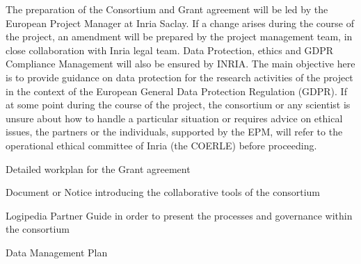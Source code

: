 \begin{workpackage}[id=management,type=MGT,wphases=1-48,
  short=Management,
  title=Management,
  lead=Inr,InrRM=34,InnRM=2,SacRM=2,TumRM=2,LieRM=2,BelRM=2,DelRM=2,FauRM=2]
\begin{tasklist}
  \begin{task}[id=legal,title={Legal Management (data, ethics, GDPR)},shorttitle={Legal},
      lead=Inr,InrRM=4,wphases=1-48]
    The preparation of the Consortium and Grant agreement will be led
    by the European Project Manager at Inria Saclay. If a change
    arises during the course of the project, an amendment will be
    prepared by the project management team, in close collaboration
    with Inria legal team.  Data Protection, ethics and GDPR
    Compliance Management will also be ensured by INRIA. The main
    objective here is to provide guidance on data protection for the
    research activities of the project in the context of the European
    General Data Protection Regulation (GDPR). If at some point during
    the course of the project, the consortium or any scientist is
    unsure about how to handle a particular situation or requires
    advice on ethical issues, the partners or the individuals,
    supported by the EPM, will refer to the operational ethical
    committee of Inria (the COERLE) before proceeding.
  \end{task}
\end{tasklist}




\begin{wpdelivs}
  \begin{wpdeliv}[due=2,id=workplan,dissem=PU,nature=R,lead=Inr,task=coordination]{Detailed workplan for the Grant agreement}\end{wpdeliv}

  \begin{wpdeliv}[due=2,id=collab-tools,dissem=PU,nature=R,lead=Inr,
task=coordination]{Document or Notice introducing the collaborative tools of the consortium}\end{wpdeliv}

  \begin{wpdeliv}[due=3,id=guide,dissem=PU,nature=R,lead=Inr,task=coordination]{Logipedia Partner Guide in order to present the processes and governance within the consortium}\end{wpdeliv}

  \begin{wpdeliv}[due=4,id=data-plan,dissem=PU,nature=R,lead=Inr,
task=coordination]{Data Management Plan}\end{wpdeliv}
\end{wpdelivs}

\end{workpackage}

